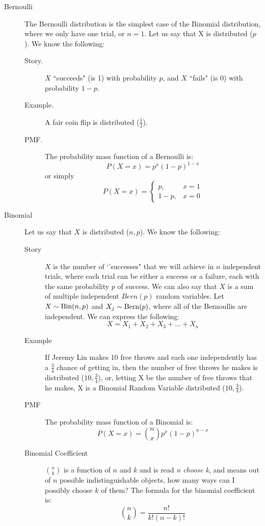 \documentclass[11pt]{article}
\begin{document}
\begin{description}
\item[Bernoulli] The Bernoulli distribution is the simplest case of the Binomial distribution, where we only have one trial, or $n=1$. Let us say that X is distributed \Bern($p$). We know the following:
\begin{description}
  \item[Story.] $X$ ``succeeds" (is 1) with probability $p$, and $X$ ``fails" (is 0) with probability $1-p$.
  \item[Example.] A fair coin flip is distributed \Bern($\frac{1}{2}$).
  \item[PMF.] The probability mass function of a Bernoulli is:
\[P(X = x) = p^x(1-p)^{1-x}\]
or simply
\[P(X = x) = \begin{cases} p, & x = 1 \\ 1-p, & x = 0 \end{cases}\]
\end{description}

\item[Binomial] Let us say that $X$ is distributed \Bin($n,p$). We know the following:
\begin{description}
  \item[Story] $X$ is the number of `'successes" that we will achieve in $n$ independent trials, where each trial can be either a success or a failure, each with the same probability $p$ of success. We can also say that $X$ is a sum of multiple independent $Bern(p)$ random variables. Let $X \sim \textrm{Bin}(n, p)$ and $X_j \sim \textrm{Bern}(p)$, where all of the Bernoullis are independent. We can express the following:
  \[X = X_1 + X_2 + X_3 + \dots + X_n\]
  \item[Example] If Jeremy Lin makes 10 free throws and each one independently has a $\frac{3}{4}$ chance of getting in, then the number of free throws he makes is distributed  \Bin($10,\frac{3}{4}$), or, letting X be the number of free throws that he makes, X is a Binomial Random Variable distributed  \Bin($10,\frac{3}{4}$).
  \item[PMF] The probability mass function of a Binomial is:
\[P(X = x) = {n  \choose x} p^x(1-p)^{n-x}\]
  \item[Binomial Coefficient] ${n  \choose k}$ is a function of $n$ and $k$ and is read \emph{n choose k}, and means out of $n$ possible indistinguishable objects, how many ways can I possibly choose $k$ of them? The formula for the binomial coefficient is:
\[{n  \choose k} = \frac{n!}{k!(n-k)!}\]
\end{description}



\end{description}
\end{document}
